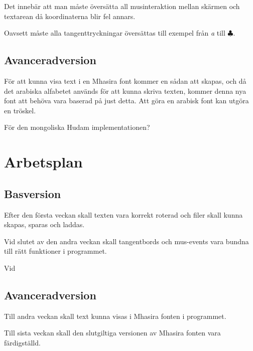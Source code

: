 \documentclass[a4paper,11p,twoside]{report}
\begin{document}
Det innebär att man måste översätta all musinteraktion mellan skärmen och textarean då koordinaterna blir fel annars.

Oavsett måste alla tangenttryckningar översättas till exempel från \emph{a} till \emph{$\clubsuit$}. 

\subsection{Avanceradversion}
För att kunna visa text i en Mhasira font kommer en sådan att skapas, och då det arabiska alfabetet används för att kunna skriva texten, kommer denna nya font att behöva vara baserad på just detta. Att göra en arabisk font kan utgöra en tröskel.

För den mongoliska Hudam implementationen?

\section{Arbetsplan}
\subsection{Basversion}
Efter den första veckan skall texten vara korrekt roterad och filer skall kunna skapas, sparas och laddas.

Vid slutet av den andra veckan skall tangentbords och mus-events vara bundna till rätt funktioner i programmet.

Vid 


\subsection{Avanceradversion}

Till andra veckan skall text kunna visas i Mhasira fonten i programmet.

Till sista veckan skall den slutgiltiga versionen av Mhasira fonten vara färdigställd.


\suectio
\end{document}
